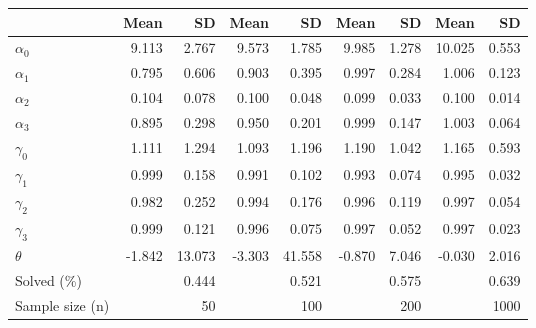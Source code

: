 
\begin{tabular}[t]{lrrrrrrrr}
\toprule
  & Mean & SD & Mean  & SD  & Mean   & SD   & Mean    & SD   \\
\midrule
$\alpha_{0}$ & 9.113 & 2.767 & 9.573 & 1.785 & 9.985 & 1.278 & 10.025 & 0.553\\
$\alpha_{1}$ & 0.795 & 0.606 & 0.903 & 0.395 & 0.997 & 0.284 & 1.006 & 0.123\\
$\alpha_{2}$ & 0.104 & 0.078 & 0.100 & 0.048 & 0.099 & 0.033 & 0.100 & 0.014\\
$\alpha_{3}$ & 0.895 & 0.298 & 0.950 & 0.201 & 0.999 & 0.147 & 1.003 & 0.064\\
$\gamma_{0}$ & 1.111 & 1.294 & 1.093 & 1.196 & 1.190 & 1.042 & 1.165 & 0.593\\
$\gamma_{1}$ & 0.999 & 0.158 & 0.991 & 0.102 & 0.993 & 0.074 & 0.995 & 0.032\\
$\gamma_{2}$ & 0.982 & 0.252 & 0.994 & 0.176 & 0.996 & 0.119 & 0.997 & 0.054\\
$\gamma_{3}$ & 0.999 & 0.121 & 0.996 & 0.075 & 0.997 & 0.052 & 0.997 & 0.023\\
$\theta$ & -1.842 & 13.073 & -3.303 & 41.558 & -0.870 & 7.046 & -0.030 & 2.016\\
Solved (\%) &  & 0.444 &  & 0.521 &  & 0.575 &  & 0.639\\
Sample size (n) &  & 50 &  & 100 &  & 200 &  & 1000\\
\bottomrule
\end{tabular}
